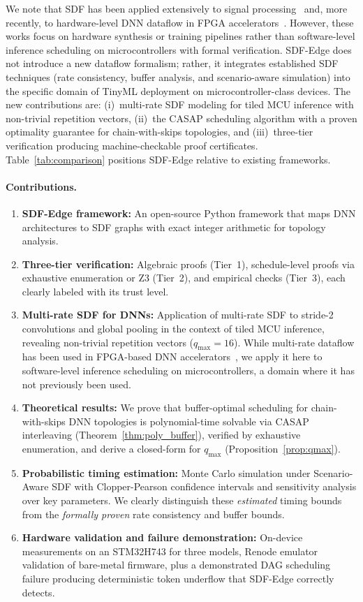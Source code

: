 \documentclass[journal]{IEEEtran}
\begin{document}
We note that SDF has been applied extensively to signal processing~\cite{bhattacharyya1996software,stuijk2006sdf3} and, more recently, to hardware-level DNN dataflow in FPGA accelerators~\cite{blott2018finn,venieris2018toolflows}.
However, these works focus on hardware synthesis or training pipelines rather than software-level inference scheduling on microcontrollers with formal verification.
SDF-Edge does not introduce a new dataflow formalism; rather, it integrates established SDF techniques (rate consistency, buffer analysis, and scenario-aware simulation) into the specific domain of TinyML deployment on microcontroller-class devices.
The new contributions are: (i)~multi-rate SDF modeling for tiled MCU inference with non-trivial repetition vectors, (ii)~the CASAP scheduling algorithm with a proven optimality guarantee for chain-with-skips topologies, and (iii)~three-tier verification producing machine-checkable proof certificates.
Table~\ref{tab:comparison} positions SDF-Edge relative to existing frameworks.

\paragraph{Contributions.}
\begin{enumerate}[nosep]
\item \textbf{SDF-Edge framework:} An open-source Python framework that maps DNN architectures to SDF graphs with exact integer arithmetic for topology analysis.
\item \textbf{Three-tier verification:} Algebraic proofs (Tier~1), schedule-level proofs via exhaustive enumeration or Z3 (Tier~2), and empirical checks (Tier~3), each clearly labeled with its trust level.
\item \textbf{Multi-rate SDF for DNNs:} Application of multi-rate SDF to stride-2 convolutions and global pooling in the context of tiled MCU inference, revealing non-trivial repetition vectors ($q_{\max} = 16$). While multi-rate dataflow has been used in FPGA-based DNN accelerators~\cite{blott2018finn}, we apply it here to software-level inference scheduling on microcontrollers, a domain where it has not previously been used.
\item \textbf{Theoretical results:} We prove that buffer-optimal scheduling for chain-with-skips DNN topologies is polynomial-time solvable via CASAP interleaving (Theorem~\ref{thm:poly_buffer}), verified by exhaustive enumeration, and derive a closed-form for $q_{\max}$ (Proposition~\ref{prop:qmax}).
\item \textbf{Probabilistic timing estimation:} Monte Carlo simulation under Scenario-Aware SDF with Clopper-Pearson confidence intervals and sensitivity analysis over key parameters. We clearly distinguish these \emph{estimated} timing bounds from the \emph{formally proven} rate consistency and buffer bounds.
\item \textbf{Hardware validation and failure demonstration:} On-device measurements on an STM32H743 for three models, Renode emulator validation of bare-metal firmware, plus a demonstrated DAG scheduling failure producing deterministic token underflow that SDF-Edge correctly detects.
\end{enumerate}
\end{document}
